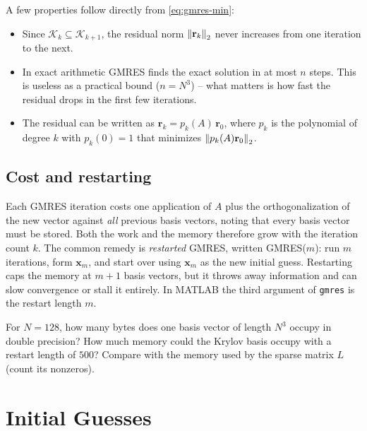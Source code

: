 A few properties follow directly from \eqref{eq:gmres-min}:
\begin{itemize}
  \item Since $\mathcal{K}_k \subseteq \mathcal{K}_{k+1}$, the residual norm
        $\norm{\mathbf{r}_k}_2$ never increases from one iteration to the next.
  \item In exact arithmetic GMRES finds the exact solution in at most $n$
        steps. This is useless as a practical bound ($n = N^3$) -- what matters
        is how fast the residual drops in the first few iterations.
  \item The residual can be written as $\mathbf{r}_k = p_k(A)\,\mathbf{r}_0$,
        where $p_k$ is the polynomial of degree $k$ with $p_k(0) = 1$ that
        minimizes $\norm{p_k(A)\mathbf{r}_0}_2$. 
\end{itemize}


\subsection{Cost and restarting}
\label{sec:gmres-restart}

Each GMRES iteration costs one application of $A$ plus the orthogonalization
of the new vector against \emph{all} previous basis vectors, noting that every basis
vector must be stored. Both the work and the memory therefore grow with the
iteration count $k$. The common remedy is \emph{restarted} GMRES, written
GMRES($m$): run $m$ iterations, form $\mathbf{x}_m$, and start over using
$\mathbf{x}_m$ as the new initial guess. Restarting caps the memory at $m+1$
basis vectors, but it throws away information and can slow convergence or
stall it entirely. In MATLAB the third argument of \texttt{gmres} is the
restart length $m$.

\begin{exercise}
For $N = 128$, how many bytes does one basis vector of length $N^3$ occupy in
double precision? How much memory could the Krylov basis occupy with a restart
length of $500$? Compare with the memory used by the sparse matrix $L$ (count
its nonzeros).
\end{exercise}

\section{Initial Guesses}
\label{sec:gmres-x0}


